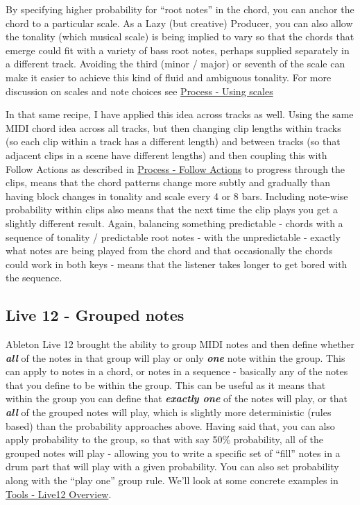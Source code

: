 \documentclass[
  12pt,
  letterpaper,
  oneside,
  open=any]{scrbook}
\begin{document}
By specifying higher probability for ``root notes'' in the chord, you
can anchor the chord to a particular scale. As a Lazy (but creative)
Producer, you can also allow the tonality (which musical scale) is being
implied to vary so that the chords that emerge could fit with a variety
of bass root notes, perhaps supplied separately in a different track.
Avoiding the third (minor / major) or seventh of the scale can make it
easier to achieve this kind of fluid and ambiguous tonality. For more
discussion on scales and note choices see
\hyperref[Chapter-018-Process-Scales]{Process - Using scales}

In that same recipe, I have applied this idea across tracks as well.
Using the same MIDI chord idea across all tracks, but then changing clip
lengths within tracks (so each clip within a track has a different
length) and between tracks (so that adjacent clips in a scene have
different lengths) and then coupling this with Follow Actions as
described in \hyperref[Chapter-003-Process-Follow_Actions]{Process -
Follow Actions} to progress through the clips, means that the chord
patterns change more subtly and gradually than having block changes in
tonality and scale every 4 or 8 bars. Including note-wise probability
within clips also means that the next time the clip plays you get a
slightly different result. Again, balancing something predictable -
chords with a sequence of tonality / predictable root notes - with the
unpredictable - exactly what notes are being played from the chord and
that occasionally the chords could work in both keys - means that the
listener takes longer to get bored with the sequence.

\subsection{Live 12 - Grouped notes}\label{live-12---grouped-notes}

Ableton Live 12 brought the ability to group MIDI notes and then define
whether \textbf{\emph{all}} of the notes in that group will play or only
\textbf{\emph{one}} note within the group. This can apply to notes in a
chord, or notes in a sequence - basically any of the notes that you
define to be within the group. This can be useful as it means that
within the group you can define that \textbf{\emph{exactly one}} of the
notes will play, or that \textbf{\emph{all}} of the grouped notes will
play, which is slightly more deterministic (rules based) than the
probability approaches above. Having said that, you can also apply
probability to the group, so that with say 50\% probability, all of the
grouped notes will play - allowing you to write a specific set of
``fill'' notes in a drum part that will play with a given probability.
You can also set probability along with the ``play one'' group rule.
We'll look at some concrete examples in
\hyperref[Chapter-030-Tools-Live12_Intro]{Tools - Live12 Overview}.
\end{document}
